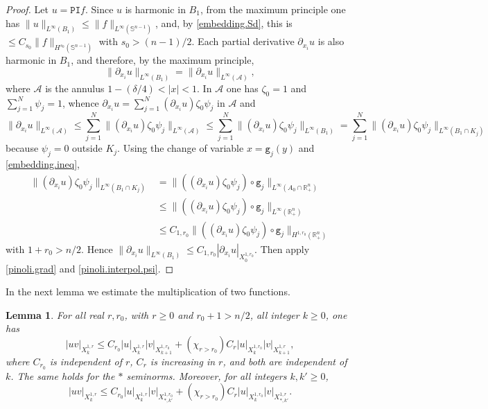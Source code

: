 \documentclass[10pt,reqno,a4paper]{article}
\numberwithin{equation}{section}
\theoremstyle{plain}
\newtheorem{lemma}[theorem]{Lemma}
\theoremstyle{definition}
\newcommand{\R}{{\mathbb R}}
\renewcommand{\S}{{\mathbb S}}
\newcommand{\mA}{\mathcal{A}}
\newcommand{\pa}{\partial}
\begin{document}
\begin{proof}
Let $u = \mathtt{PI} f$. 
Since $u$ is harmonic in $B_1$, from the maximum principle one has 
$\| u \|_{L^\infty(B_1)} \leq \| f \|_{L^\infty(\S^{n-1})}$, 
and, by \eqref{embedding.Sd}, this is 
$\leq C_{s_0} \| f \|_{H^{s_0}(\S^{n-1})}$ with $s_0 > (n-1)/2$.
Each partial derivative $\pa_{x_i} u$ is also harmonic in $B_1$, 
and therefore, by the maximum principle,  
\[
\| \pa_{x_i} u \|_{L^\infty(B_1)} = \| \pa_{x_i} u \|_{L^\infty(\mA)},
\]
where $\mA$ is the annulus $1-(\delta/4) < |x| < 1$.   
In $\mA$ one has $\zeta_0 = 1$ and $\sum_{j=1}^N \psi_j = 1$, whence 
$\pa_{x_i} u = \sum_{j=1}^N (\pa_{x_i} u) \zeta_0 \psi_j$ in $\mA$ and 
\[
\| \pa_{x_i} u \|_{L^\infty(\mA)} 
\leq \sum_{j=1}^N \| (\pa_{x_i} u) \zeta_0 \psi_j \|_{L^\infty(\mA)} 
\leq \sum_{j=1}^N \| (\pa_{x_i} u) \zeta_0 \psi_j \|_{L^\infty(B_1)} 
= \sum_{j=1}^N \| (\pa_{x_i} u) \zeta_0 \psi_j \|_{L^\infty(B_1 \cap K_j)} 
\]
because $\psi_j = 0$ outside $K_j$. 
Using the change of variable $x = \mathtt g_j(y)$ and \eqref{embedding.ineq}, 
\begin{align*}
\| (\pa_{x_i} u) \zeta_0 \psi_j \|_{L^\infty(B_1 \cap K_j)} 
& = \| ((\pa_{x_i} u) \zeta_0 \psi_j) \circ \mathtt g_j \|_{L^\infty(A_0 \cap \R^n_+)} 
\\ 
& \leq \| ((\pa_{x_i} u) \zeta_0 \psi_j) \circ \mathtt g_j \|_{L^\infty(\R^n_+)}
\\ 
& \leq C_{1,r_0} \| ((\pa_{x_i} u) \zeta_0 \psi_j) \circ \mathtt g_j \|_{H^{1,r_0}(\R^n_+)}
\end{align*}
with $1+r_0 > n/2$. 
Hence $\| \pa_{x_i} u \|_{L^\infty(B_1)} \leq C_{1,r_0} |\pa_{x_i} u|_{X^{1, r_0}_0}$.   
Then apply \eqref{pinoli.grad} and \eqref{pinoli.interpol.psi}.
\end{proof}


In the next lemma we estimate the multiplication of two functions. 

\begin{lemma} \label{lemma:pinoli.prod}
For all real $r,r_0$, with $r \geq 0$ and $r_0 + 1 > n/2$,
all integer $k \geq 0$, one has 
\begin{equation} \label{pinoli.prod}
|uv|_{X^{1,r}_k} \leq C_{r_0} |u|_{X^{1,r}_k} |v|_{X^{1,r_0}_{k+1}} 
+ (\chi_{r > r_0}) C_r |u|_{X^{1,r_0}_k} |v|_{X^{1,r}_{k+1}},
\end{equation}
where $C_{r_0}$ is independent of $r$, $C_r$ is increasing in $r$, 
and both are independent of $k$. 
The same holds for the $*$ seminorms. 
Moreover, for all integers $k, k' \geq 0$, 
\begin{equation} \label{pinoli.prod.mixed.*}
|uv|_{X^{1,r}_k} \leq C_{r_0} |u|_{X^{1,r}_k} |v|_{X^{1,r_0}_{*,k'}} 
+ (\chi_{r > r_0}) C_r |u|_{X^{1,r_0}_k} |v|_{X^{1,r}_{*,k'}}.
\end{equation}
\end{lemma}
\end{document}
